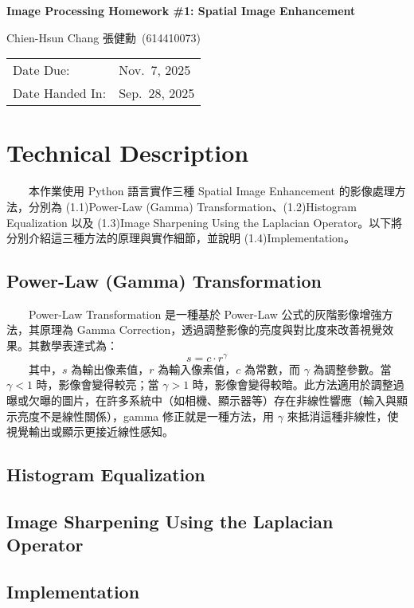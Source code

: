 \documentclass[12pt,a4paper]{article}
\newcommand{\HomeworkTitle}{Image Processing Homework \#1: Spatial Image Enhancement}
\newcommand{\StudentName}{Chien-Hsun Chang 張健勳}
\newcommand{\StudentID}{614410073}
\newcommand{\StudentInfo}{\StudentName~(\StudentID)}
\newcommand{\DateDue}{Nov.\ 7, 2025}
\newcommand{\DateHandedIn}{Sep.\ 28, 2025}
\begin{document}
\begin{titlepage} %
	\centering
	{\vspace*{2cm}\Huge\bfseries \HomeworkTitle\par}
	\vspace{2cm}
    {\Large \StudentInfo\par}
	\vfill
	\begin{tabular}{ll}
		Date Due: & {\DateDue} \\
		Date Handed In: & {\DateHandedIn} \\
	\end{tabular}
	\vfill
\end{titlepage}

\section{Technical Description} %
　　本作業使用 Python 語言實作三種 Spatial Image Enhancement 的影像處理方法，分別為 (1.1)Power-Law (Gamma) Transformation、(1.2)Histogram Equalization 以及 (1.3)Image Sharpening Using the Laplacian Operator。以下將分別介紹這三種方法的原理與實作細節，並說明 (1.4)Implementation。
\subsection{Power-Law (Gamma) Transformation} %
　　Power-Law Transformation 是一種基於 Power-Law 公式的灰階影像增強方法，其原理為 Gamma Correction，透過調整影像的亮度與對比度來改善視覺效果。其數學表達式為：
\[ s = c \cdot r^{\gamma} \]
　　其中，\( s \) 為輸出像素值，\( r \) 為輸入像素值，\( c \) 為常數，而 \( \gamma \) 為調整參數。當 \( \gamma < 1 \) 時，影像會變得較亮；當 \( \gamma > 1 \) 時，影像會變得較暗。此方法適用於調整過曝或欠曝的圖片，在許多系統中（如相機、顯示器等）存在非線性響應（輸入與顯示亮度不是線性關係），gamma 修正就是一種方法，用 \( \gamma \) 來抵消這種非線性，使視覺輸出或顯示更接近線性感知。
\subsection{Histogram Equalization} %
\subsection{Image Sharpening Using the Laplacian Operator} %
\subsection{Implementation} %
\end{document}
